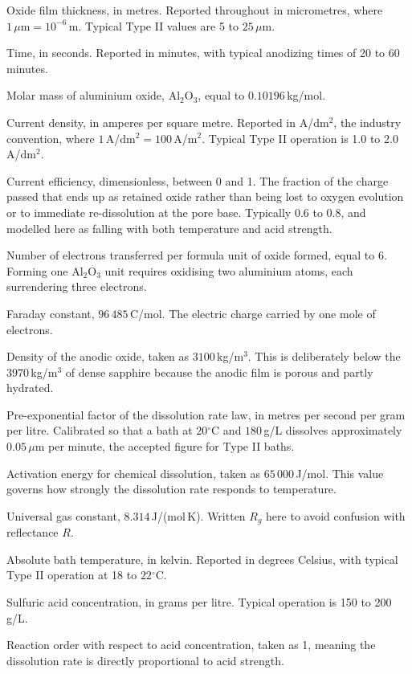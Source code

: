 \documentclass[11pt,a4paper]{article}
\newcommand{\um}{\ensuremath{\,\mu\mathrm{m}}}
\newcommand{\degC}{\ensuremath{^\circ\mathrm{C}}}
\newenvironment{symlist}
  {\vspace{-0.2em}\begin{list}{}{%
    \setlength{\leftmargin}{2.4em}\setlength{\labelwidth}{2.0em}%
    \setlength{\labelsep}{0.4em}\setlength{\itemsep}{1pt}%
    \setlength{\parsep}{0pt}\setlength{\topsep}{3pt}%
    \renewcommand{\makelabel}[1]{##1\hfil}}}
  {\end{list}}
\begin{document}
\begin{symlist}
\item[$x$] Oxide film thickness, in metres. Reported throughout in micrometres,
where $1\um = 10^{-6}$\,m. Typical Type II values are 5 to $25\um$.
\item[$t$] Time, in seconds. Reported in minutes, with typical anodizing times
of 20 to 60 minutes.
\item[$M_\mathrm{ox}$] Molar mass of aluminium oxide, $\mathrm{Al_2O_3}$, equal
to $0.10196$\,kg/mol.
\item[$j$] Current density, in amperes per square metre. Reported in
A/dm$^2$, the industry convention, where $1$\,A/dm$^2 = 100$\,A/m$^2$. Typical
Type II operation is 1.0 to 2.0\,A/dm$^2$.
\item[$\eta$] Current efficiency, dimensionless, between 0 and 1. The fraction
of the charge passed that ends up as retained oxide rather than being lost to
oxygen evolution or to immediate re-dissolution at the pore base. Typically
0.6 to 0.8, and modelled here as falling with both temperature and acid
strength.
\item[$z$] Number of electrons transferred per formula unit of oxide formed,
equal to 6. Forming one $\mathrm{Al_2O_3}$ unit requires oxidising two aluminium
atoms, each surrendering three electrons.
\item[$F$] Faraday constant, $96\,485$\,C/mol. The electric charge carried by
one mole of electrons.
\item[$\rho_\mathrm{ox}$] Density of the anodic oxide, taken as
$3100$\,kg/m$^3$. This is deliberately below the $3970$\,kg/m$^3$ of dense
sapphire because the anodic film is porous and partly hydrated.
\item[$k_0$] Pre-exponential factor of the dissolution rate law, in metres per
second per gram per litre. Calibrated so that a bath at $20\degC$ and
$180$\,g/L dissolves approximately $0.05\um$ per minute, the accepted figure for
Type II baths.
\item[$E_a$] Activation energy for chemical dissolution, taken as
$65\,000$\,J/mol. This value governs how strongly the dissolution rate responds
to temperature.
\item[$R_g$] Universal gas constant, $8.314$\,J/(mol\,K). Written $R_g$ here to
avoid confusion with reflectance $R$.
\item[$T$] Absolute bath temperature, in kelvin. Reported in degrees Celsius,
with typical Type II operation at 18 to $22\degC$.
\item[{$[\mathrm{H_2SO_4}]$}] Sulfuric acid concentration, in grams per litre.
Typical operation is 150 to 200\,g/L.
\item[$m$] Reaction order with respect to acid concentration, taken as 1,
meaning the dissolution rate is directly proportional to acid strength.
\end{symlist}
\end{document}
